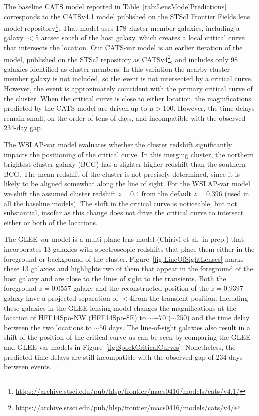 The baseline CATS model reported in
Table~\ref{tab:LensModelPredictions} corresponds to the CATSv4.1 model
published on the STScI Frontier Fields lens model
repository\footnote{\url{https://archive.stsci.edu/pub/hlsp/frontier/macs0416/models/cats/v4.1/}}.
That model uses 178 cluster member galaxies, including a galaxy $<$5
arcsec south of the \spock host galaxy, which creates a local critical
curve that intersects the \spocktwo location.  Our CATS-var model is
an earlier iteration of the model, published on the STScI repository
as
CATSv4\footnote{\url{https://archive.stsci.edu/pub/hlsp/frontier/macs0416/models/cats/v4/}},
and includes only 98 galaxies identified as cluster members.  In this
variation the nearby cluster member galaxy is not included, so the
\spocktwo event is not intersected by a critical curve. However, the
\spockone event is approximately coincident with the primary
critical curve of the  cluster.  When the critical curve is
close to either \spock location, the magnifications predicted by the
CATS model are driven up to $\mu>100$.  However, the time delays
remain small, on the order of tens of days, and incompatible with the
observed 234-day gap.

The WSLAP-var model evaluates whether the cluster redshift
significantly impacts the positioning of the critical curve. In this
merging cluster, the northern brightest cluster galaxy (BCG) has a
slighter higher redshift than the southern BCG. The mean redshift of
the cluster is not precisely determined, since it is likely to be
aligned somewhat along the line of sight.  For the WSLAP-var model we
shift the assumed cluster redshift $z=0.4$ from the default $z=0.396$
(used in all the baseline models).  The shift in the critical curve is
noticeable, but not substantial, insofar as this change does not drive
the critical curve to intersect either or both of the \spock
locations.

The GLEE-var model is a multi-plane lens model (Chiriv{\`i} et al.~in
prep.) that incorporates 13 galaxies with spectroscopic redshifts that
place them either in the foreground or background of the 
cluster.  Figure~\ref{fig:LineOfSightLenses} marks these 13 galaxies
and highlights two of them that appear in the foreground of the \spock
host galaxy and are close to the lines of sight to the \spock
transients. Both the foreground $z=0.0557$ galaxy and the
reconstructed position of the $z=0.9397$ galaxy have a projected
separation of $<$4\arcsec from the \spocktwo transient position.
Including these galaxies in the GLEE lensing model changes the
magnifications at the location of HFF14Spo-NW (HFF14Spo-SE) to
$\sim-70$ ($\sim250$) and the time delay between the two locations to
$\sim50$ days.  The line-of-sight galaxies also result in a shift of
the position of the critical curve--as can be seen by comparing the
GLEE and GLEE-var models in
Figure~\ref{fig:SpockCriticalCurves}. Nonetheless, the predicted time
delays are still incompatible with the observed gap of 234 days
between events.

